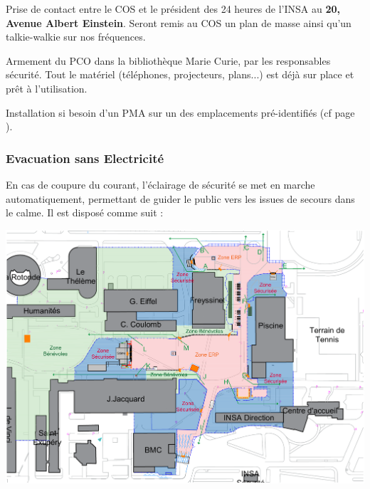 \documentclass[hidelinks, paper=a4, fontsize=13pt]{report}
\begin{document}
\begin{list}{•}{}
	\item Prise de contact entre le COS et le président des 24 heures de l'INSA au \textbf{20, Avenue Albert Einstein}. Seront remis au COS un plan de masse ainsi qu’un talkie-walkie sur nos fréquences.
	\item Armement du PCO dans la bibliothèque Marie Curie, par les responsables sécurité. Tout le matériel (téléphones, projecteurs, plans...) est déjà sur place et prêt à l'utilisation. 
	\item Installation si besoin d’un PMA sur un des emplacements pré-identifiés (cf page \pageref{refEmplacementPMA}).
\end{list}


\subsubsection{Evacuation sans Electricité}
En cas de coupure du courant, l’éclairage de sécurité se met en marche automatiquement, permettant de guider le public vers les issues de secours dans le calme. Il est disposé comme suit :
\begin{center}
	\includegraphics[width=.8\textwidth,keepaspectratio]{Exports/Plan_24h_44eme-Blocs_Phares}
\end{center}



\newpage
\end{document}
